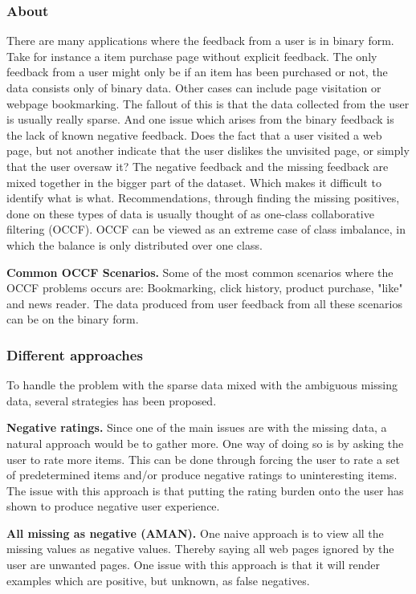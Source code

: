 \subsubsection{About}
There are many applications where the feedback from a user is in binary form.
Take for instance a item purchase page without explicit feedback.
The only feedback from a user might only be if an item has been purchased or not, the data consists only of binary data.
Other cases can include page visitation or webpage bookmarking.
The fallout of this is that the data collected from the user is usually really sparse.
And one issue which arises from the binary feedback is the lack of known negative feedback.
Does the fact that a user visited a web page, but not another indicate that the user dislikes the unvisited page, or simply that the user oversaw it?
The negative feedback and the missing feedback are mixed together in the bigger part of the dataset.
Which makes it difficult to identify what is what.
Recommendations, through finding the missing positives, done on these types of data is usually thought of as one-class collaborative filtering (OCCF).
OCCF can be viewed as an extreme case of class imbalance, in which the balance is only distributed over one class. 

\textbf{Common OCCF Scenarios.}
Some of the most common scenarios where the OCCF problems occurs are:
Bookmarking, click history, product purchase, "like" and news reader.
The data produced from user feedback from all these scenarios can be on the binary form.

\subsubsection{Different approaches}
To handle the problem with the sparse data mixed with the ambiguous missing data, several strategies has been proposed.

\textbf{Negative ratings.}
Since one of the main issues are with the missing data, a natural approach would be to gather more.
One way of doing so is by asking the user to rate more items.
This can be done through forcing the user to rate a set of predetermined items and/or produce negative ratings to uninteresting items.
The issue with this approach is that putting the rating burden onto the user has shown to produce negative user experience. 

\textbf{All missing as negative (AMAN).}
One naive approach is to view all the missing values as negative values.
Thereby saying all web pages ignored by the user are unwanted pages.
One issue with this approach is that it will render examples which are positive, but unknown, as false negatives.

